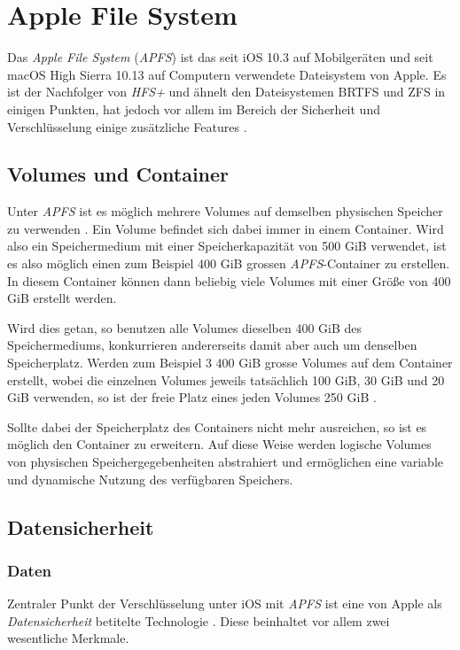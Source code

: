 \section{Apple File System}
Das \textit{Apple File System} (\textit{APFS}) ist das seit iOS 10.3 auf
Mobilgeräten und seit macOS High Sierra 10.13 auf Computern verwendete
Dateisystem von Apple. Es ist der Nachfolger von \textit{HFS+} und ähnelt den
Dateisystemen BRTFS und ZFS in einigen Punkten, hat jedoch vor allem im Bereich
der Sicherheit und Verschlüsselung einige zusätzliche Features \cite{golem,
apple_filesystem_reference}.

\subsection{Volumes und Container}
Unter \textit{APFS} ist es möglich mehrere Volumes auf demselben physischen
Speicher zu verwenden \cite{about_apfs}. Ein Volume befindet sich dabei immer in
einem Container. Wird also ein Speichermedium mit einer Speicherkapazität von
500 GiB verwendet, ist es also möglich einen zum Beispiel 400 GiB grossen
\textit{APFS}-Container zu erstellen. In diesem Container können dann beliebig
viele Volumes mit einer Größe von 400 GiB erstellt werden.

Wird dies getan, so benutzen alle Volumes dieselben 400 GiB des Speichermediums,
konkurrieren andererseits damit aber auch um denselben Speicherplatz. Werden zum
Beispiel 3 400 GiB grosse Volumes auf dem Container erstellt, wobei die
einzelnen Volumes jeweils tatsächlich 100 GiB, 30 GiB und 20 GiB verwenden, so
ist der freie Platz eines jeden Volumes 250 GiB \cite{golem}.

Sollte dabei der Speicherplatz des Containers nicht mehr ausreichen, so ist es
möglich den Container zu erweitern.  Auf diese Weise werden logische Volumes von
physischen Speichergegebenheiten abstrahiert und ermöglichen eine variable und
dynamische Nutzung des verfügbaren Speichers.

\subsection{Datensicherheit}

\subsubsection{Daten}
Zentraler Punkt der Verschlüsselung unter iOS mit \textit{APFS} ist eine von
Apple als \textit{Datensicherheit} betitelte Technologie \cite[S. 48
ff]{apple2020}. Diese beinhaltet vor allem zwei wesentliche Merkmale.

